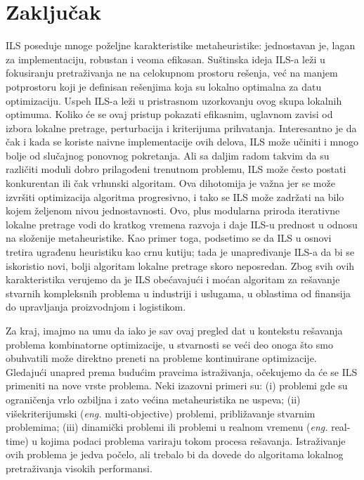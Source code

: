 \documentclass[a4paper]{article}
\newcommand{\eng}[1]{(\textit{eng.} #1)}
\begin{document}
\section{Zaključak}
\label{sec:zakljucak}

ILS poseduje mnoge poželjne karakteristike metaheuristike: jednostavan je, lagan za implementaciju, robustan i veoma efikasan. Suštinska ideja ILS-a leži u fokusiranju pretraživanja ne na celokupnom prostoru rešenja, već na manjem potprostoru koji je definisan rešenjima koja su lokalno optimalna za datu optimizaciju. Uspeh ILS-a leži u pristrasnom uzorkovanju ovog skupa lokalnih optimuma. Koliko će se ovaj pristup pokazati efikasnim, uglavnom zavisi od izbora lokalne pretrage, perturbacija i kriterijuma prihvatanja. Interesantno je da čak i kada se koriste naivne implementacije ovih delova, ILS može učiniti i mnogo bolje od slučajnog ponovnog pokretanja. Ali sa daljim radom takvim da su različiti moduli dobro prilagođeni trenutnom problemu, ILS može često postati konkurentan ili čak vrhunski algoritam. Ova dihotomija je važna jer se može izvršiti optimizacija algoritma progresivno, i tako se ILS može zadržati na bilo kojem željenom nivou jednostavnosti. Ovo, plus modularna priroda iterativne lokalne pretrage vodi do kratkog vremena razvoja i daje ILS-u prednost u odnosu na složenije metaheuristike. Kao primer toga, podsetimo se da ILS u osnovi tretira ugrađenu heuristiku kao crnu kutiju; tada je unapređivanje ILS-a da bi se iskoristio novi, bolji algoritam lokalne pretrage skoro neposredan. Zbog svih ovih karakteristika verujemo da je ILS obećavajući i moćan algoritam za rešavanje stvarnih kompleksnih problema u industriji i uslugama, u oblastima od finansija do upravljanja proizvodnjom i logistikom.

Za kraj, imajmo na umu da iako je sav ovaj pregled dat u kontekstu rešavanja problema kombinatorne optimizacije, u stvarnosti se veći deo onoga što smo obuhvatili može direktno preneti na probleme kontinuirane optimizacije. Gledajući unapred prema budućim pravcima istraživanja, očekujemo da će se ILS primeniti na nove vrste problema. Neki izazovni primeri su: (i) problemi gde su ograničenja vrlo ozbiljna i zato većina metaheuristika ne uspeva; (ii) višekriterijumski \eng{multi-objective} problemi, približavanje stvarnim problemima; (iii) dinamički problemi ili problemi u realnom vremenu \eng{real-time} u kojima podaci problema variraju tokom procesa rešavanja.
Istraživanje ovih problema je jedva počelo, ali trebalo bi da dovede do algoritama lokalnog pretraživanja visokih performansi.

\clearpage 


\appendix
 

\end{document}
